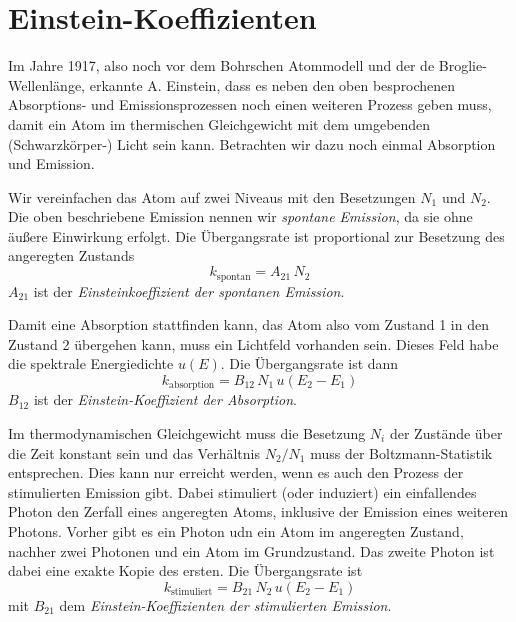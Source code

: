 \section{Einstein-Koeffizienten}

Im Jahre 1917, also noch vor dem Bohrschen Atommodell und der de Broglie-Wellenlänge, erkannte A. Einstein, dass es neben den oben besprochenen Absorptions- und Emissionsprozessen noch einen weiteren Prozess geben muss, damit ein Atom im thermischen Gleichgewicht mit dem umgebenden (Schwarzkörper-) Licht sein kann. Betrachten wir dazu noch einmal Absorption und Emission.

Wir vereinfachen das Atom auf zwei Niveaus mit den Besetzungen $N_1$ und $N_2$. Die oben beschriebene Emission nennen wir \emph{spontane Emission}, da sie ohne äußere Einwirkung erfolgt. Die Übergangsrate ist proportional zur Besetzung des angeregten Zustands
\begin{equation}
    k_\text{spontan} = A_{21} \, N_2 \label{eq:7_k_spontan}
\end{equation}
$A_{21}$ ist der \emph{Einsteinkoeffizient der spontanen Emission}.


Damit eine Absorption stattfinden kann, das Atom also vom Zustand 1 in den Zustand 2 übergehen kann, muss ein Lichtfeld vorhanden sein. Dieses Feld habe die spektrale Energiedichte $u(E)$. Die Übergangsrate ist dann
\begin{equation}
    k_\text{absorption} = B_{12} \, N_1 \, u(E_2 - E_1) \label{eq:7_k_abs}
\end{equation}
$B_{12}$ ist der \emph{Einstein-Koeffizient der Absorption}.

Im thermodynamischen Gleichgewicht muss die Besetzung $N_i$ der Zustände über die Zeit konstant sein und das Verhältnis $N_2 / N_1$ muss der Boltzmann-Statistik entsprechen. Dies kann nur erreicht werden, wenn es auch den  Prozess der stimulierten Emission gibt. Dabei stimuliert  (oder induziert) ein einfallendes Photon den Zerfall eines angeregten Atoms, inklusive der Emission eines weiteren Photons. Vorher gibt es ein Photon udn ein Atom im angeregten Zustand, nachher  zwei Photonen und ein Atom im Grundzustand. Das zweite Photon ist dabei eine exakte Kopie des ersten. Die Übergangsrate ist 
\begin{equation}
    k_\text{stimuliert} = B_{21} \, N_2 \, u(E_2 - E_1) \label{eq:7_k_stim}
\end{equation}
mit $B_{21}$ dem  \emph{Einstein-Koeffizienten der stimulierten Emission}.


